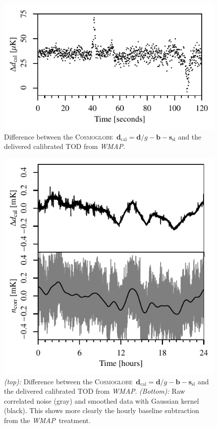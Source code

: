 \documentclass[twocolumn]{../../common/aa}
\def\WMAP{\emph{WMAP}}
\newcommand{\cosmoglobe}{\textsc{Cosmoglobe}}
\begin{document}
\begin{figure}
	\includegraphics[width=\columnwidth]{figures/K113_TOD_diff_10min.pdf}
	\caption{Difference between the \cosmoglobe\ $\boldsymbol d_\mathrm{cal}=\boldsymbol d/g-\boldsymbol b - \boldsymbol s_\mathrm{sl}$ and the delivered calibrated TOD from \WMAP.}
	\label{fig:cal_comp_10min}
\end{figure}

\begin{figure}
	\includegraphics[width=\columnwidth]{figures/K113_TOD_diff_10hr.pdf}
	\caption{\textit{(top):} Difference between the \cosmoglobe\ $\boldsymbol d_\mathrm{cal}=\boldsymbol d/g-\boldsymbol b - \boldsymbol s_\mathrm{sl}$ and the delivered calibrated TOD from \WMAP. \textit{(Bottom):} Raw correlated noise (gray) and smoothed data with Gaussian kernel (black). This shows more clearly the hourly baseline subtraction from the \WMAP\ treatment.}
	\label{fig:cal_comp}
\end{figure}
\end{document}
